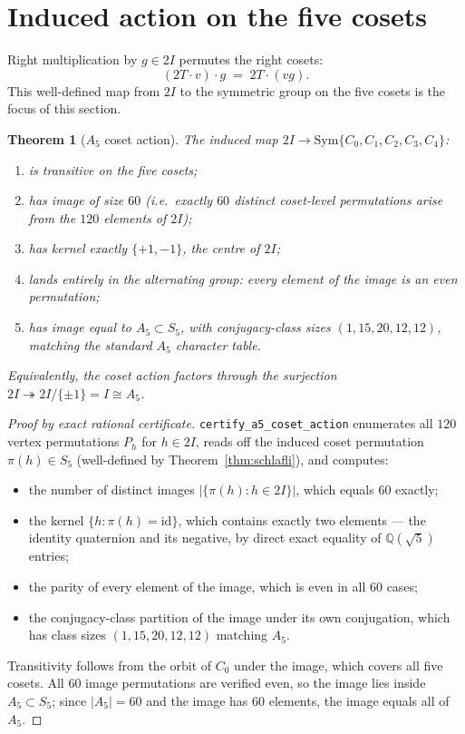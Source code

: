 \documentclass[11pt]{article}
\newcommand{\twoI}{2I}
\newcommand{\twoT}{2T}
\theoremstyle{plain}
\newtheorem{theorem}{Theorem}
\theoremstyle{definition}
\begin{document}
\section{Induced action on the five cosets}\label{sec:a5}

Right multiplication by $g\in\twoI$ permutes the right cosets:
\[
  (\twoT\!\cdot\! v) \cdot g \;=\; \twoT\!\cdot\!(v g).
\]
This well-defined map from $\twoI$ to the symmetric group on the
five cosets is the focus of this section.

\begin{theorem}[$A_5$ coset action]\label{thm:a5action}
The induced map $\twoI \to \mathrm{Sym}\{C_0, C_1, C_2, C_3, C_4\}$:
\begin{enumerate}
  \item is transitive on the five cosets;
  \item has image of size $60$ (i.e.\ exactly $60$ distinct
        coset-level permutations arise from the $120$ elements of
        $\twoI$);
  \item has kernel exactly $\{+1, -1\}$, the centre of $\twoI$;
  \item lands entirely in the alternating group: every element of
        the image is an even permutation;
  \item has image equal to $A_5\subset S_5$, with conjugacy-class
        sizes $(1, 15, 20, 12, 12)$, matching the standard $A_5$
        character table.
\end{enumerate}
Equivalently, the coset action factors through the surjection
$\twoI \twoheadrightarrow \twoI/\{\pm 1\} = I \cong A_5$.
\end{theorem}

\begin{proof}[Proof by exact rational certificate]
\texttt{certify\_a5\_coset\_action} enumerates all $120$ vertex
permutations $P_h$ for $h\in\twoI$, reads off the induced coset
permutation $\pi(h)\in S_5$ (well-defined by
Theorem~\ref{thm:schlafli}), and computes:

\begin{itemize}
  \item the number of distinct images
        $|\{\pi(h) : h\in\twoI\}|$, which equals $60$ exactly;
  \item the kernel
        $\{h : \pi(h) = \mathrm{id}\}$, which contains exactly two
        elements --- the identity quaternion and its negative, by
        direct exact equality of $\mathbb{Q}(\sqrt 5)$ entries;
  \item the parity of every element of the image, which is even
        in all $60$ cases;
  \item the conjugacy-class partition of the image under its own
        conjugation, which has class sizes
        $(1, 15, 20, 12, 12)$ matching $A_5$.
\end{itemize}

Transitivity follows from the orbit of $C_0$ under the image, which
covers all five cosets.  All $60$ image permutations are verified
even, so the image lies inside $A_5\subset S_5$; since $|A_5|=60$
and the image has $60$ elements, the image equals all of $A_5$.
\end{proof}
\end{document}
